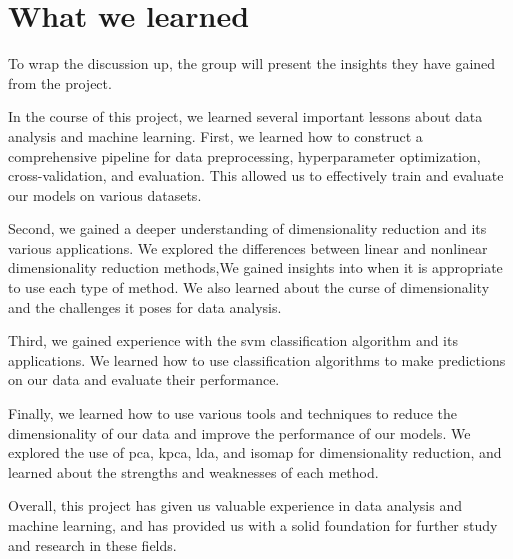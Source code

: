 \section{What we learned}\label{sec:what-we-learned}
To wrap the discussion up, the group will present the insights they have gained from the project. 


In the course of this project, we learned several important lessons about data analysis and machine learning. First, we learned how to construct a comprehensive pipeline for data preprocessing, hyperparameter optimization, cross-validation, and evaluation. This allowed us to effectively train and evaluate our models on various datasets.

Second, we gained a deeper understanding of dimensionality reduction and its various applications. We explored the differences between linear and nonlinear dimensionality reduction methods,We gained insights into when it is appropriate to use each type of method. We also learned about the curse of dimensionality and the challenges it poses for data analysis.

Third, we gained experience with the svm classification algorithm and its applications. We learned how to use classification algorithms to make predictions on our data and evaluate their performance.

Finally, we learned how to use various tools and techniques to reduce the dimensionality of our data and improve the performance of our models. We explored the use of \gls{pca}, \gls{kpca}, \gls{lda}, and \gls{isomap} for dimensionality reduction, and learned about the strengths and weaknesses of each method.

Overall, this project has given us valuable experience in data analysis and machine learning, and has provided us with a solid foundation for further study and research in these fields.





